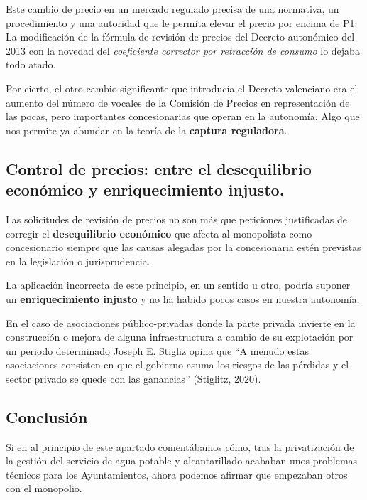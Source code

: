 \documentclass[
]{article}
\begin{document}
Este cambio de precio en un mercado regulado precisa de una normativa,
un procedimiento y una autoridad que le permita elevar el precio por
encima de P1. La modificación de la fórmula de revisión de precios del
Decreto autonómico del 2013 con la novedad del \emph{coeficiente
corrector por retracción de consumo} lo dejaba todo atado.

Por cierto, el otro cambio significante que introducía el Decreto
valenciano era el aumento del número de vocales de la Comisión de
Precios en representación de las pocas, pero importantes concesionarias
que operan en la autonomía. Algo que nos permite ya abundar en la teoría
de la \textbf{captura reguladora}.

\hypertarget{control-de-precios-entre-el-desequilibrio-econuxf3mico-y-enriquecimiento-injusto.}{%
\subsection{Control de precios: entre el desequilibrio económico y
enriquecimiento
injusto.}\label{control-de-precios-entre-el-desequilibrio-econuxf3mico-y-enriquecimiento-injusto.}}

Las solicitudes de revisión de precios no son más que peticiones
justificadas de corregir el \textbf{desequilibrio económico} que afecta
al monopolista como concesionario siempre que las causas alegadas por la
concesionaria estén previstas en la legislación o jurisprudencia.

La aplicación incorrecta de este principio, en un sentido u otro, podría
suponer un \textbf{enriquecimiento injusto} y no ha habido pocos casos
en nuestra autonomía.

En el caso de asociaciones público-privadas donde la parte privada
invierte en la construcción o mejora de alguna infraestructura a cambio
de su explotación por un periodo determinado Joseph E. Stigliz opina que
``A menudo estas asociaciones consisten en que el gobierno asuma los
riesgos de las pérdidas y el sector privado se quede con las ganancias''
(Stiglitz, 2020).

\hypertarget{conclusiuxf3n-1}{%
\subsection*{Conclusión}\label{conclusiuxf3n-1}}

Si en al principio de este apartado comentábamos cómo, tras la
privatización de la gestión del servicio de agua potable y
alcantarillado acababan unos problemas técnicos para los Ayuntamientos,
ahora podemos afirmar que empezaban otros con el monopolio.
\end{document}

